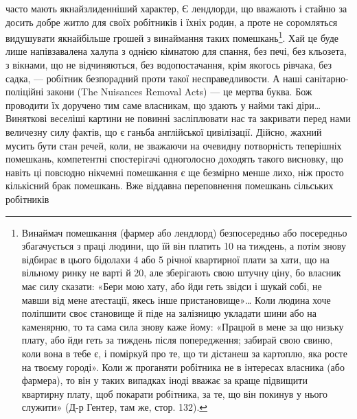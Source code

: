 часто мають якнайзлиденніший характер, Є лендлорди, що вважають
і стайню за досить добре житло для своїх робітників
і їхніх родин, а проте не соромляться видушувати якнайбільше
грошей з винаймання таких помешкань\footnote{
Винаймач помешкання (фармер або лендлорд) безпосередньо або
посередньо збагачується з праці людини, що їй він платить 10
на тиждень, а потім знову відбирає в цього бідолахи 4 або 5 річної квартирної плати за хати, що на вільному ринку не
варті й 20, але зберігають свою штучну ціну, бо власник
має силу сказати: «Бери мою хату, або йди геть звідси і шукай собі,
не мавши від мене атестації, якесь інше пристановище»\dots{} Коли людина
хоче поліпшити своє становище й піде на залізницю укладати шини або
на каменярню, то та сама сила знову каже йому: «Працюй в мене за що
низьку плату, або йди геть за тиждень після попередження; забирай свою
свиню, коли вона в тебе є, і поміркуй про те, що ти дістанеш за картоплю,
яка росте на твоєму городі». Коли ж проганяти робітника не в інтересах
власника (або фармера), то він у таких випадках іноді вважає за краще
підвищити квартирну плату, щоб покарати робітника, за те, що він
покинув у нього служити» (Д-р Гентер, там же, стор. 132).
}. Хай це буде лише
напівзавалена халупа з однією кімнатою для спання, без печі,
без кльозета, з вікнами, що не відчиняються, без водопостачання,
крім якогось рівчака, без садка, — робітник безпорадний проти
такої несправедливости. А наші санітарно-поліційні закони
(The Nuisances Removal Acts) — це мертва буква. Бож проводити
їх доручено тим саме власникам, що здають у найми
такі діри\dots{} Виняткові веселіші картини не повинні засліплювати
нас та закривати перед нами величезну силу фактів, що є ганьба
англійської цивілізації. Дійсно, жахний мусить бути стан речей,
коли, не зважаючи на очевидну потворність теперішніх
помешкань, компетентні спостерігачі одноголосно доходять такого
висновку, що навіть ці повсюдно нікчемні помешкання є ще
безмірно менше лихо, ніж просто кількісний брак помешкань.
Вже віддавна переповнення помешкань сільських робітників
\parbreak{}  %
